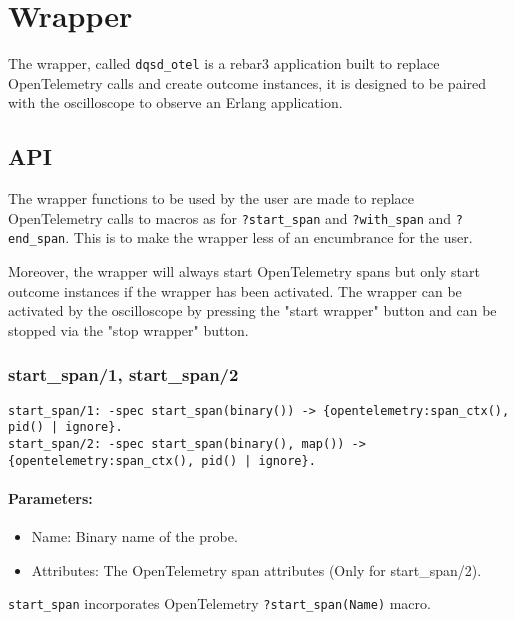 \section{Wrapper}
    The wrapper, called \texttt{dqsd\_otel} is a rebar3 \cite{rebar3} application built to replace OpenTelemetry calls and create outcome instances, it is designed to be paired with the oscilloscope to observe an Erlang application.
    
    \subsection{API}
        The wrapper functions to be used by the user are made to replace OpenTelemetry calls to macros as for \texttt{?start\_span} and \texttt{?with\_span} and \texttt{?end\_span}. This is to make the wrapper less of an encumbrance for the user. 

        Moreover, the wrapper will always start OpenTelemetry spans but only start outcome instances if the wrapper has been activated. The wrapper can be activated by the oscilloscope by pressing the "start wrapper" button and can be stopped via the "stop wrapper" button.
         
        \subsubsection{start\_span/1, start\_span/2}
        
        \begin{verbatim}        
start_span/1: -spec start_span(binary()) -> {opentelemetry:span_ctx(), pid() | ignore}.
start_span/2: -spec start_span(binary(), map()) -> {opentelemetry:span_ctx(), pid() | ignore}.  
        \end{verbatim}
        
        \paragraph{Parameters:}
        \begin{itemize}
            \item Name: Binary name of the probe.
            \item Attributes: The OpenTelemetry span attributes (Only for start\_span/2).
        \end{itemize} 
        
        \texttt{start\_span} incorporates OpenTelemetry \texttt{?start\_span(Name)} macro.
        
